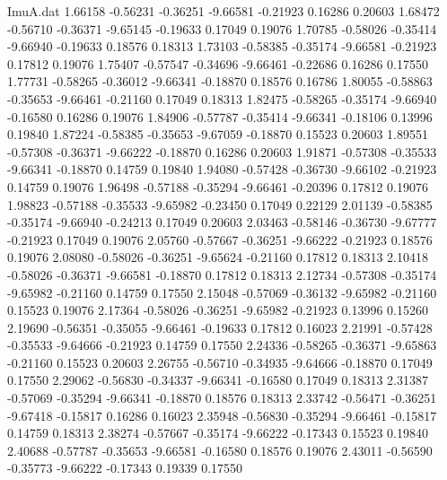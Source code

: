 \begin{filecontents}{ImuA.dat}
   1.66158   -0.56231   -0.36251   -9.66581   -0.21923    0.16286    0.20603
   1.68472   -0.56710   -0.36371   -9.65145   -0.19633    0.17049    0.19076
   1.70785   -0.58026   -0.35414   -9.66940   -0.19633    0.18576    0.18313
   1.73103   -0.58385   -0.35174   -9.66581   -0.21923    0.17812    0.19076
   1.75407   -0.57547   -0.34696   -9.66461   -0.22686    0.16286    0.17550
   1.77731   -0.58265   -0.36012   -9.66341   -0.18870    0.18576    0.16786
   1.80055   -0.58863   -0.35653   -9.66461   -0.21160    0.17049    0.18313
   1.82475   -0.58265   -0.35174   -9.66940   -0.16580    0.16286    0.19076
   1.84906   -0.57787   -0.35414   -9.66341   -0.18106    0.13996    0.19840
   1.87224   -0.58385   -0.35653   -9.67059   -0.18870    0.15523    0.20603
   1.89551   -0.57308   -0.36371   -9.66222   -0.18870    0.16286    0.20603
   1.91871   -0.57308   -0.35533   -9.66341   -0.18870    0.14759    0.19840
   1.94080   -0.57428   -0.36730   -9.66102   -0.21923    0.14759    0.19076
   1.96498   -0.57188   -0.35294   -9.66461   -0.20396    0.17812    0.19076
   1.98823   -0.57188   -0.35533   -9.65982   -0.23450    0.17049    0.22129
   2.01139   -0.58385   -0.35174   -9.66940   -0.24213    0.17049    0.20603
   2.03463   -0.58146   -0.36730   -9.67777   -0.21923    0.17049    0.19076
   2.05760   -0.57667   -0.36251   -9.66222   -0.21923    0.18576    0.19076
   2.08080   -0.58026   -0.36251   -9.65624   -0.21160    0.17812    0.18313
   2.10418   -0.58026   -0.36371   -9.66581   -0.18870    0.17812    0.18313
   2.12734   -0.57308   -0.35174   -9.65982   -0.21160    0.14759    0.17550
   2.15048   -0.57069   -0.36132   -9.65982   -0.21160    0.15523    0.19076
   2.17364   -0.58026   -0.36251   -9.65982   -0.21923    0.13996    0.15260
   2.19690   -0.56351   -0.35055   -9.66461   -0.19633    0.17812    0.16023
   2.21991   -0.57428   -0.35533   -9.64666   -0.21923    0.14759    0.17550
   2.24336   -0.58265   -0.36371   -9.65863   -0.21160    0.15523    0.20603
   2.26755   -0.56710   -0.34935   -9.64666   -0.18870    0.17049    0.17550
   2.29062   -0.56830   -0.34337   -9.66341   -0.16580    0.17049    0.18313
   2.31387   -0.57069   -0.35294   -9.66341   -0.18870    0.18576    0.18313
   2.33742   -0.56471   -0.36251   -9.67418   -0.15817    0.16286    0.16023
   2.35948   -0.56830   -0.35294   -9.66461   -0.15817    0.14759    0.18313
   2.38274   -0.57667   -0.35174   -9.66222   -0.17343    0.15523    0.19840
   2.40688   -0.57787   -0.35653   -9.66581   -0.16580    0.18576    0.19076
   2.43011   -0.56590   -0.35773   -9.66222   -0.17343    0.19339    0.17550

\end{filecontents}
